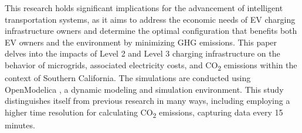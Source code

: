 \documentclass[conference, usletter]{IEEEtran}
\begin{document}
This research holds significant implications for the advancement of intelligent transportation systems, as it aims to address the economic needs of EV charging infrastructure owners and determine the optimal configuration that benefits both EV owners and the environment by minimizing GHG emissions. This paper delves into the impacts of  Level 2 and Level 3 charging infrastructure on the behavior of microgrids, associated electricity costs, and CO\textsubscript{2} emissions within the context of Southern California. The simulations are conducted using OpenModelica \cite{ModelicaLanguage}, a dynamic modeling and simulation environment. This study distinguishes itself from previous research in many ways, including employing a higher time resolution for calculating CO\textsubscript{2} emissions, capturing data every 15 minutes.
\end{document}
